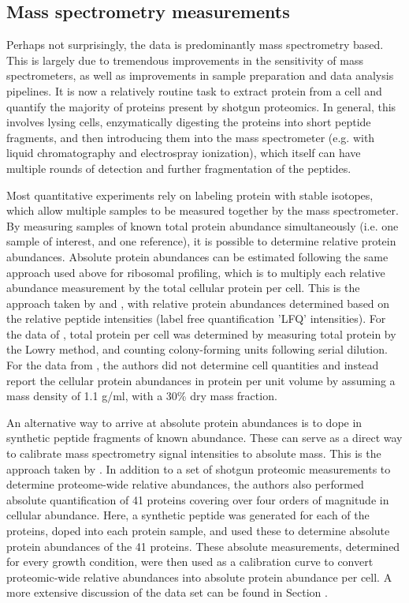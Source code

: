 \subsection{Mass spectrometry measurements}

Perhaps not surprisingly, the data is predominantly mass spectrometry based. This is
largely due to tremendous improvements in the sensitivity of mass spectrometers,
as well as improvements in sample preparation and data analysis
pipelines. It is now a relatively routine task to extract protein from a cell
and quantify the majority of proteins present by shotgun proteomics. In general, this
involves lysing cells, enzymatically digesting the proteins into short peptide
fragments, and then introducing them into the mass spectrometer (e.g.
with liquid chromatography and electrospray ionization), which itself can
have multiple rounds of detection and further fragmentation of the peptides.

Most quantitative experiments rely on labeling protein with stable isotopes,
which allow multiple samples to be measured together by the mass
spectrometer. By measuring samples of known total protein abundance simultaneously (i.e. one
sample of interest, and one reference), it is possible to determine relative
protein abundances. Absolute protein
abundances can be estimated following the same approach used above for ribosomal
profiling, which is to multiply each relative abundance measurement by the total
cellular protein per cell. This is the approach taken by \cite{valgepea2013} and
\cite{peebo2015}, with relative protein abundances determined based on the
relative peptide intensities (label free quantification 'LFQ' intensities). For
the data of \cite{valgepea2013}, total protein per cell was determined by
measuring  total protein by the Lowry method, and counting colony-forming units
following serial dilution. For the data from   \cite{peebo2015}, the authors did
not determine  cell quantities and instead report the cellular protein
abundances in protein per unit  volume by assuming a mass density of 1.1 g/ml,
with a 30\% dry mass fraction.

An alternative way to arrive at absolute protein abundances is to dope in
synthetic peptide  fragments of known abundance. These can serve as a direct way
to calibrate mass spectrometry  signal intensities to absolute mass. This is the
approach taken by \cite{schmidt2016}. In addition  to a set of shotgun proteomic
measurements to determine proteome-wide relative abundances,  the authors also
performed absolute quantification of  41 proteins covering over four orders of
magnitude in cellular abundance. Here,  a synthetic peptide was generated for
each of the proteins, doped into each protein sample, and used these to
determine absolute protein abundances of the 41 proteins. These absolute
measurements, determined for every growth condition,  were then used as a
calibration curve to convert proteomic-wide relative abundances into  absolute
protein abundance per cell. A more extensive discussion of the
\cite{schmidt2016} data set can be found in Section .

